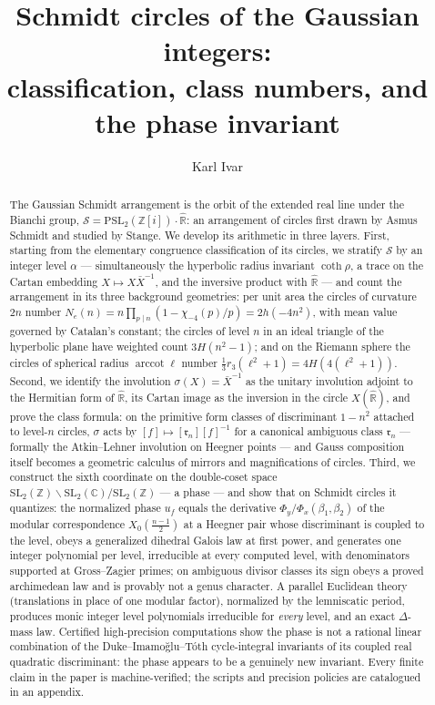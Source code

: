 \documentclass[11pt]{amsart}
\numberwithin{equation}{section}
\theoremstyle{plain}
\theoremstyle{definition}
\theoremstyle{remark}
\newcommand{\C}{\mathbb{C}}
\newcommand{\R}{\mathbb{R}}
\newcommand{\Z}{\mathbb{Z}}
\newcommand{\Zi}{\Z[i]}
\newcommand{\Rhat}{\widehat{\R}}
\newcommand{\SL}{\mathrm{SL}}
\newcommand{\PSL}{\mathrm{PSL}}
\newcommand{\arccot}{\operatorname{arccot}}
\newcommand{\Sarr}{\mathcal{S}}
\newcommand{\idealr}{\mathfrak{r}}
\begin{document}
\title[Schmidt circles of the Gaussian integers]{Schmidt circles of the
Gaussian integers:\\ classification, class numbers, and the phase invariant}

\author{Karl Ivar}

\begin{abstract}
The Gaussian Schmidt arrangement is the orbit of the extended real line
under the Bianchi group, $\Sarr = \PSL_2(\Zi)\cdot\Rhat$: an arrangement
of circles first drawn by Asmus Schmidt and studied by Stange.  We develop its arithmetic in three layers.  First, starting from
the elementary congruence classification of its circles, we stratify
$\Sarr$ by an integer level $\alpha$ --- simultaneously the hyperbolic
radius invariant $\coth\rho$, a trace on the Cartan embedding
$X \mapsto X\bar X^{-1}$, and the inversive product with $\Rhat$ --- and
count the arrangement in its three background geometries: per unit area the
circles of curvature $2n$ number
$N_e(n) = n\prod_{p \mid n}(1 - \chi_{-4}(p)/p) = 2h(-4n^2)$, with mean
value governed by Catalan's constant; the circles of level $n$ in an ideal
triangle of the hyperbolic plane have weighted count $3H(n^2-1)$; and on
the Riemann sphere the circles of spherical radius $\arccot\ell$ number
$\tfrac13 r_3(\ell^2+1) = 4H(4(\ell^2+1))$.  Second, we identify the
involution $\sigma(X) = \bar X^{-1}$ as the unitary involution adjoint to
the Hermitian form of $\Rhat$, its Cartan image as the inversion in the
circle $X(\Rhat)$, and prove the class formula: on the primitive form
classes of discriminant $1-n^2$ attached to level-$n$ circles, $\sigma$
acts by $[f] \mapsto [\idealr_n][f]^{-1}$ for a canonical ambiguous class
$\idealr_n$ --- formally the Atkin--Lehner involution on Heegner points ---
and Gauss composition itself becomes a geometric calculus of mirrors and
magnifications of circles.  Third, we construct the sixth coordinate on the
double-coset space $\SL_2(\Z)\backslash\SL_2(\C)/\SL_2(\Z)$ --- a phase ---
and show that on Schmidt circles it quantizes: the normalized phase $u_f$
equals the derivative $\Phi_y/\Phi_x(\beta_1, \beta_2)$ of the modular
correspondence $X_0(\tfrac{n-1}{2})$ at a Heegner pair whose discriminant
is coupled to the level, obeys a generalized dihedral Galois law at first
power, and generates one integer polynomial per level, irreducible at every
computed level, with denominators supported at Gross--Zagier primes; on
ambiguous divisor classes its sign obeys a proved archimedean law and is
provably not a genus character.  A parallel Euclidean theory (translations
in place of one modular factor), normalized by the lemniscatic period,
produces monic integer level polynomials irreducible for \emph{every}
level, and an exact $\Delta$-mass law.  Certified high-precision
computations show the phase is not a rational linear combination of the
Duke--Imamo\u{g}lu--T\'oth cycle-integral invariants of its coupled real
quadratic discriminant: the phase appears to be a genuinely new invariant.
Every finite claim in the paper is machine-verified; the scripts and
precision policies are catalogued in an appendix.
\end{abstract}
\end{document}
